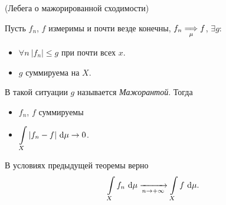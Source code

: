 \begin{theorem}(Лебега о мажорированной сходимости)
    
    Пусть $f_n$, $f$ измеримы и почти везде конечны, $f_n \underset{\mu}{\Longrightarrow} f$, 
    $\exists g\colon~$
    \begin{itemize}
        \item $\forall n~ |f_n| \leqslant g$ при почти всех $x$.
        \item $g$ суммируема на $X$.
    \end{itemize} 
    В такой ситуации $g$ называется \textit{Мажорантой}. Тогда
    \begin{itemize}
        \item $f_n$, $f$ суммируемы
        \item $\displaystyle \int\limits_{X}{|f_n - f| ~\mathrm{d}\mu} \to 0$.
    \end{itemize} 
\end{theorem}

\begin{corollary}
    
    В условиях предыдущей теоремы верно
\[
    \int\limits_{X}{f_n ~\mathrm{d}\mu} \xrightarrow[n \to +\infty]{} \int\limits_{X}{f ~\mathrm{d}\mu}
.\] 
\end{corollary}
